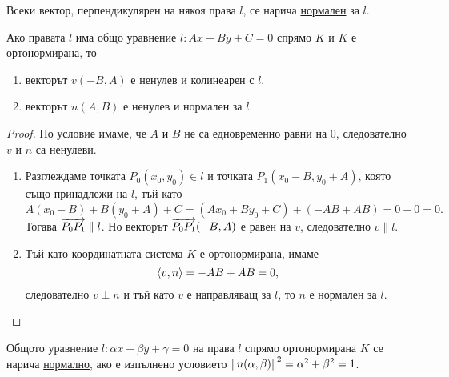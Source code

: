 \documentclass[numbers=endperiod, DIV=15, bibliography=totocnumbered]{scrartcl}
\begin{document}
\begin{definition}
  Всеки вектор, перпендикулярен на някоя права $l$, се нарича \uline{нормален} за $l$.
\end{definition}

\begin{proposition}
  Ако правата $l$ има общо уравнение $l: Ax + By + C = 0$ спрямо $K$ и $K$ е ортонормирана, то
  \begin{enumerate}
    \item векторът $v(-B, A)$ е ненулев и колинеарен с $l$.
    \item векторът $n(A, B)$ е ненулев и нормален за $l$.
  \end{enumerate}
\end{proposition}
\begin{proof}
  По условие имаме, че $A$ и $B$ не са едновременно равни на $0$, следователно $v$ и $n$ са ненулеви.
  \begin{enumerate}
    \item Разглеждаме точката $P_0(x_0, y_0) \in l$ и точката $P_1(x_0 - B, y_0 + A)$, която също принадлежи на $l$, тъй като
    \begin{displaymath}
      A(x_0 - B) + B(y_0 + A) + C = (Ax_0 + By_0 + C) + (-AB + AB) = 0 + 0 = 0.
    \end{displaymath}
     Тогава $\overrightarrow{P_0 P_1} \parallel l$. Но векторът $\overrightarrow{P_0 P_1}(-B, A)$ е равен на $v$, следователно $v \parallel l$.

    \item Тъй като координатната система $K$ е ортонормирана, имаме
    \begin{displaymath}
      \left\langle v, n \right\rangle = -AB + AB = 0,
    \end{displaymath}
    следователно $v \perp n$ и тъй като $v$ е направляващ за $l$, то $n$ е нормален за $l$.
  \end{enumerate}
\end{proof}

\begin{definition}
  Общото уравнение $l: \alpha x + \beta y + \gamma = 0$ на права $l$ спрямо ортонормирана $K$ се нарича \uline{нормално}, ако е изпълнено условието $\left\Vert n(\alpha, \beta) \right\Vert^2 = \alpha^2 + \beta^2 = 1$.
\end{definition}
\end{document}
